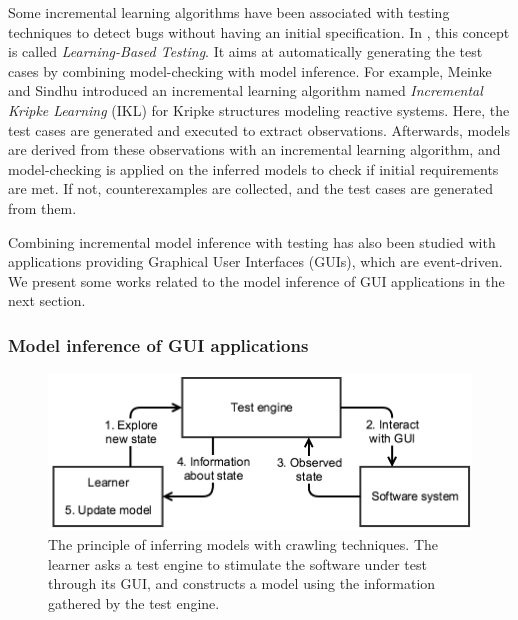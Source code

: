 Some incremental learning algorithms have been associated with
testing techniques to detect bugs without having an initial
specification. In \cite{Meinke:2004:ABT:1007512.1007532,tap2011},
this concept is called \textit{Learning-Based Testing}. It aims
at automatically generating the test cases by combining
model-checking with model inference. For example, Meinke and
Sindhu \cite{tap2011} introduced an incremental learning
algorithm named \textit{Incremental Kripke Learning} (IKL) for
Kripke structures modeling reactive systems. Here, the test
cases are generated and executed to extract observations.
Afterwards, models are derived from these observations with an
incremental learning algorithm, and model-checking is applied on
the inferred models to check if initial requirements are met. If
not, counterexamples are collected, and the test cases are
generated from them.

Combining incremental model inference with testing has also been
studied with applications providing Graphical User Interfaces
(GUIs), which are event-driven. We present some works related to
the model inference of GUI applications in the next section.

\subsubsection{Model inference of GUI applications}
\label{sec:active-crawling}

\begin{figure}[ht]
    \begin{center}
        \includegraphics[width=0.9\linewidth]{figures/crawler.png}
    \end{center}

    \caption{The principle of inferring models with crawling
    techniques. The learner asks a test engine to stimulate the
	software under test through its GUI, and constructs a model
	using the information gathered by the test engine.}
    \label{fig:crawler}
\end{figure}

